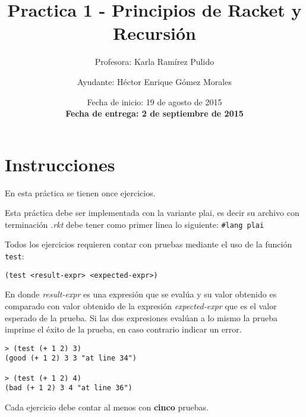\documentclass{article}
\author{Profesora: Karla Ramírez Pulido \and
  Ayudante: Héctor Enrique Gómez Morales}
\title{Practica 1 - Principios de Racket y Recursión}
\date{Fecha de inicio: 19 de agosto de 2015\\
  \textbf{Fecha de entrega: 2 de septiembre de 2015}}
\begin{document}
\maketitle
\section{Instrucciones}
En esta práctica se tienen once ejercicios.

Esta práctica debe ser implementada con la variante plai, es decir
su archivo con terminación \textit{.rkt} debe tener como primer linea lo siguiente:
\texttt{\#lang plai}

Todos los ejercicios requieren contar con pruebas mediante el uso de
la función \texttt{test}:
\begin{verbatim}
(test <result-expr> <expected-expr>)
\end{verbatim}

En donde \textit{result-expr} es una expresión que se evalúa y su valor obtenido
es comparado con valor obtenido de la expresión \textit{expected-expr} que es el
valor esperado de la prueba. Si las dos expresiones evalúan a lo mismo la prueba
imprime el éxito de la prueba, en caso contrario indicar un error.

\begin{verbatim}
> (test (+ 1 2) 3)
(good (+ 1 2) 3 3 "at line 34")

> (test (+ 1 2) 4)
(bad (+ 1 2) 3 4 "at line 36")
\end{verbatim}

Cada ejercicio debe contar al menos con \textbf{cinco} pruebas.
\end{document}
